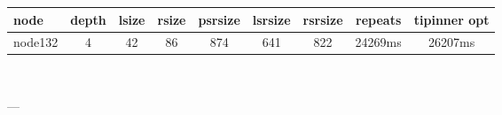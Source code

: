 

\begin{tabular}{|l|c|c|c|c|c|c|c|c|}
\hline node & depth & lsize & rsize & psrsize & lsrsize & rsrsize   & repeats & tipinner opt\\
    \hline node132 & 4 & 42 & 86 & 874 & 641 & 822 & 24269ms & 26207ms\\

\hline
\end{tabular} \

---

